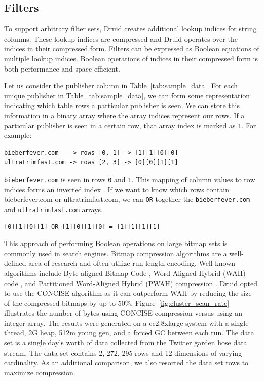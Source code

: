 \documentclass{vldb}
\begin{document}
\subsection{Filters}
To support arbitrary filter sets, Druid creates additional lookup
indices for string columns. These lookup indices are compressed and
Druid operates over the indices in their compressed form. Filters can
be expressed as Boolean equations of multiple lookup indices. Boolean
operations of indices in their compressed form is both performance and
space efficient.

Let us consider the publisher column in
Table~\ref{tab:sample_data}. For each unique publisher in
Table~\ref{tab:sample_data}, we can form some representation
indicating which table rows a particular publisher is seen. We can
store this information in a binary array where the array indices
represent our rows. If a particular publisher is seen in a certain
row, that array index is marked as \texttt{1}. For example:
\begin{verbatim}
bieberfever.com   -> rows [0, 1] -> [1][1][0][0]
ultratrimfast.com -> rows [2, 3] -> [0][0][1][1]
\end{verbatim}

\texttt{\href{http://bieberfever.com}{bieberfever.com}} is seen in rows \texttt{0} and \texttt{1}. This mapping of column values
to row indices forms an inverted index \cite{tomasic1993performance}. If we want to know which
rows contain {\ttfamily bieberfever.com} or {\ttfamily ultratrimfast.com}, we can \texttt{OR} together
the \texttt{bieberfever.com} and \texttt{ultratrimfast.com} arrays.
\begin{verbatim}
[0][1][0][1] OR [1][0][1][0] = [1][1][1][1]
\end{verbatim}

This approach of performing Boolean operations on large bitmap sets is
commonly used in search engines. Bitmap compression algorithms are a
well-defined area of research and often utilize run-length
encoding. Well known algorithms include Byte-aligned Bitmap Code \cite{antoshenkov1995byte},
Word-Aligned Hybrid (WAH) code \cite{wu2006optimizing}, and Partitioned Word-Aligned
Hybrid (PWAH) compression \cite{van2011memory}. Druid opted to use the CONCISE
algorithm \cite{colantonio2010concise} as it can outperform WAH by reducing the size of the
compressed bitmaps by up to 50\%.  Figure~\ref{fig:cluster_scan_rate} illustrates the number of
bytes using CONCISE compression versus using an integer array. The
results were generated on a cc2.8xlarge system with a single thread,
2G heap, 512m young gen, and a forced GC between each run. The data
set is a single day’s worth of data collected from the Twitter garden
hose \cite{twitter2013} data stream. The data set contains 2, 272, 295 rows and 12
dimensions of varying cardinality. As an additional comparison, we
also resorted the data set rows to maximize compression.
\end{document}
